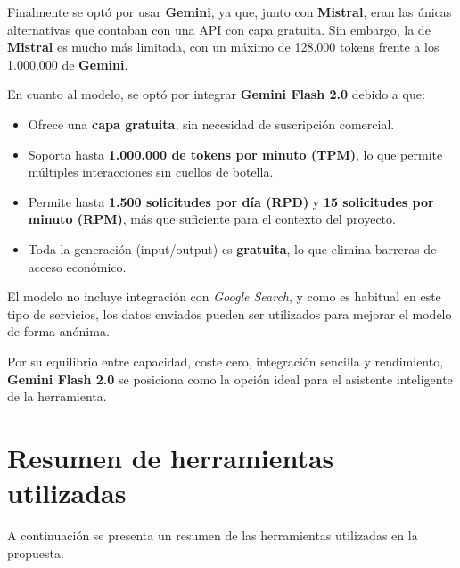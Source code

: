\begin{parskipenv}
Finalmente se optó por usar \textbf{Gemini}, ya que, junto con \textbf{Mistral}, eran las únicas alternativas que contaban con una API con capa gratuita. Sin embargo, la de \textbf{Mistral} es mucho más limitada, con un máximo de 128.000 tokens frente a los 1.000.000 de \textbf{Gemini}.

En cuanto al modelo, se optó por integrar \textbf{Gemini Flash 2.0} debido a que:

\begin{itemize}
  \item Ofrece una \textbf{capa gratuita}, sin necesidad de suscripción comercial.
  \item Soporta hasta \textbf{1.000.000 de tokens por minuto (TPM)}, lo que permite múltiples interacciones sin cuellos de botella.
  \item Permite hasta \textbf{1.500 solicitudes por día (RPD)} y \textbf{15 solicitudes por minuto (RPM)}, más que suficiente para el contexto del proyecto.
  \item Toda la generación (input/output) es \textbf{gratuita}, lo que elimina barreras de acceso económico.
\end{itemize}

El modelo no incluye integración con \textit{Google Search}, y como es habitual en este tipo de servicios, los datos enviados pueden ser utilizados para mejorar el modelo de forma anónima.

Por su equilibrio entre capacidad, coste cero, integración sencilla y rendimiento, \textbf{Gemini Flash 2.0} se posiciona como la opción ideal para el asistente inteligente de la herramienta.

\section{Resumen de herramientas utilizadas}
A continuación se presenta un resumen de las herramientas utilizadas en la propuesta.


\end{parskipenv}
